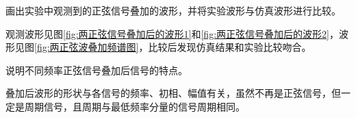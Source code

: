 \begin{Exercise}
	画出实验中观测到的正弦信号叠加的波形，并将实验波形与仿真波形进行比较。
\end{Exercise}

\begin{Answer}
	观测波形见图\ref{fig:两正弦信号叠加后的波形1}和\ref{fig:两正弦信号叠加后的波形2}，波形见图\ref{fig:两正弦波叠加频谱图}，比较后发现仿真结果和实验比较吻合。
\end{Answer}

\begin{Exercise}
	说明不同频率正弦信号叠加后信号的特点。
\end{Exercise}

\begin{Answer}
	叠加后波形的形状与各信号的频率、初相、幅值有关，虽然不再是正弦信号，但一定是周期信号，且周期与最低频率分量的信号周期相同。
\end{Answer}

